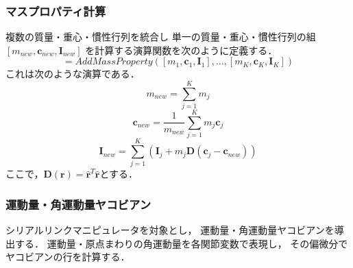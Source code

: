 
\subsubsection{マスプロパティ計算}
複数の質量・重心・慣性行列を統合し
単一の質量・重心・慣性行列の組
$[m_{new}, \bm{c}_{new}, \bm{I}_{new}]$
を計算する演算関数を次のように定義する．
\begin{equation}
[m_{new}, \bm{c}_{new}, \bm{I}_{new}]
= AddMassProperty(
[m_{1}, \bm{c}_{1}, \bm{I}_{1}]
,\hdots,
[m_{K}, \bm{c}_{K}, \bm{I}_{K}]
)
\end{equation}
これは次のような演算である．
\begin{equation}
m_{new} = \sum_{j=1}^{K}m_{j}
\end{equation}
\begin{equation}
\bm{c}_{new} = \frac{1}{m_{new}}\sum_{j=1}^{K} m_j \bm{c}_j
\end{equation}
\begin{equation}
\bm{I}_{new} = \sum_{j=1}^{K}
\left(
\bm{I}_j + m_j \bm{D}(\bm{c}_{j} - \bm{c}_{new})
\right)
\end{equation}
ここで，$\bm{D}(\bm{r})=\hat{\bm{r}}^T\hat{\bm{r}}$とする．

\subsubsection{運動量・角運動量ヤコビアン}
シリアルリンクマニピュレータを対象とし，
運動量・角運動量ヤコビアンを導出する．
運動量・原点まわりの角運動量を各関節変数で表現し，
その偏微分でヤコビアンの行を計算する．

